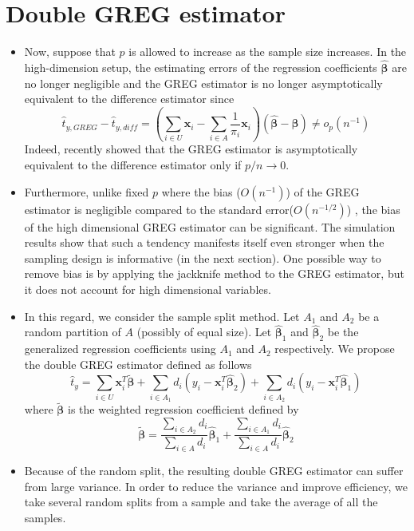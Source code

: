 \documentclass[12pt]{article}
\renewcommand{\bf}[1]{\boldsymbol{\mathbf{#1}}}
\newcommand{\pa}[1]{\left(#1\right)} %
\begin{document}
\section{Double GREG estimator}
\begin{itemize}
    \item Now, suppose that $p$ is allowed to increase as the sample size increases. In the high-dimension setup, the estimating errors of the regression coefficients $\hat {\bf \beta}$ are no longer negligible and the GREG estimator is no longer asymptotically equivalent to the difference estimator since
$$
\hat t_{y, GREG} - \hat t_{y, diff} = 
\pa{\sum_{i \in U} \bf x_i - \sum_{i \in A}\frac{1}{\pi_i} \bf x_i } \pa{\hat {\bf \beta} - \bf \beta} \neq o_p(n^{-1}) 
$$
Indeed, \cite{ta2020generalized} recently showed that 
the GREG estimator is asymptotically equivalent to the difference estimator only if $p / n \to 0$.
    \item Furthermore, unlike fixed $p$ where the bias ($O(n^{-1})$) of the GREG estimator is negligible compared to the standard error($O(n^{-1/2})$) \citep{cochran1977sampling}, the bias of the high dimensional GREG estimator can be significant. The simulation results show that such a tendency manifests itself even stronger when the sampling design is informative (in the next section). One possible way to remove bias is by applying the jackknife method to the GREG estimator, but it does not account for high dimensional variables.
    \item In this regard, we consider the sample split method. Let $A_1$ and $A_2$ be a random partition of $A$ (possibly of equal size). Let $\hat {\bf \beta}_1$ and $\hat {\bf \beta}_2$ be the generalized regression coefficients using $A_1$ and $A_2$ respectively. We propose the double GREG estimator defined as follows
    \begin{equation}
  \hat t_y = \sum_{i \in U}\bf x_i^T\tilde {\bf \beta}  + \sum_{i \in A_1} d_i \pa{y_i - \bf x_i^T \hat{\bf \beta}_2} + \sum_{i \in A_2} d_i \pa{y_i - \bf x_i^T \hat{\bf \beta}_1} \label{double}        
    \end{equation}
  where $\tilde {\bf \beta}$ is the weighted regression coefficient defined by
  \begin{equation}
        \tilde {\bf \beta} = \frac{\sum_{i \in A_2}d_i}{\sum_{i \in A}d_i} \hat{\bf \beta}_1 + \frac{\sum_{i \in A_1}d_i}{\sum_{i \in A}d_i} \hat{\bf \beta}_2 
  \end{equation}
  \item Because of the random split, the resulting double GREG estimator can suffer from large variance. In order to reduce the variance and improve efficiency, we take several random splits from a sample and take the average of all the samples.

\end{itemize}
\end{document}
